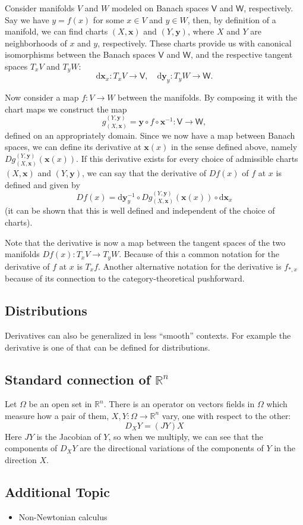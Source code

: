 \documentclass[12pt]{article}
\def\R{{\mathbb R}}
\def\V{{\mathsf V}}
\def\W{{\mathsf W}}
\def\x{{\mathbf x}}
\def\y{{\mathbf y}}
\def\d{{\mathrm d}}
\def\of{\circ}
\begin{document}
	Consider manifolds $V$ and $W$ modeled on Banach spaces $\V$ and $\W$,
	respectively. Say we have
	$y=f(x)$ for some $x\in V$ and $y\in W$, then, by definition of a
	manifold, we can find charts $(X,\x)$ and $(Y,\y)$, where $X$ and $Y$
	are neighborhoods of $x$ and $y$, respectively. These charts provide us
	with canonical isomorphisms between the Banach spaces $\V$ and $\W$,
	and the respective tangent spaces $T_x V$ and $T_y W$:
	\[
		\d\x_x \colon T_x V \to \V, \quad
		\d\y_y \colon T_y W \to \W.
	\]

	Now consider a map $f\colon V\to W$ between the manifolds. By
	composing it with the chart maps we construct the map
	\[ g_{(X,\x)}^{(Y,\y)}=\y\of f\of \x^{-1} \colon \V \to \W, \]
	defined on an appropriately  domain.
	Since we now have a map between Banach spaces, we can define its
	derivative at $\x(x)$ in the sense defined above, namely
	$Dg_{(X,\x)}^{(Y,\y)}(\x(x))$. If this derivative exists for every
	choice of admissible charts $(X,\x)$ and $(Y,\y)$, we can say that
	the derivative of $Df(x)$ of $f$ at $x$ is defined and given by
	\[ Df(x) = \d\y_y^{-1}\of Dg_{(X,\x)}^{(Y,\y)}(\x(x)) \of \d\x_x \]
	(it can be shown that this is well defined and independent of the
	choice of charts).

	Note that the derivative is now a map between the tangent spaces of
	the two manifolds $Df(x)\colon T_x V \to T_y W$. Because of this a
	common notation for the derivative of $f$ at $x$ is $T_x f$. Another
	alternative notation for the derivative is $f_{*,x}$ because of its
	connection to the category-theoretical pushforward.

\subsection*{Distributions}
	Derivatives can also be generalized in less ``smooth'' contexts.
	For example the derivative is one  of
	 that can be
	defined for distributions.

\subsection*{Standard connection of $\R^n$}
Let $\Omega$ be an open set in $\R^n$. There is an operator on vectors fields in $\Omega$ which measure how a
pair of them, $X,Y:\Omega\to \R^n$ vary, one with respect to the other: 
$$D_XY=(JY)X$$
Here $JY$ is the Jacobian of $Y$, so when we multiply, we can see that the components 
of $D_XY$ are the directional variations of the components of $Y$ in the direction $X$.

\subsection*{Additional Topic}
\begin{itemize}
\item Non-Newtonian calculus
\end{itemize}





\end{document}
